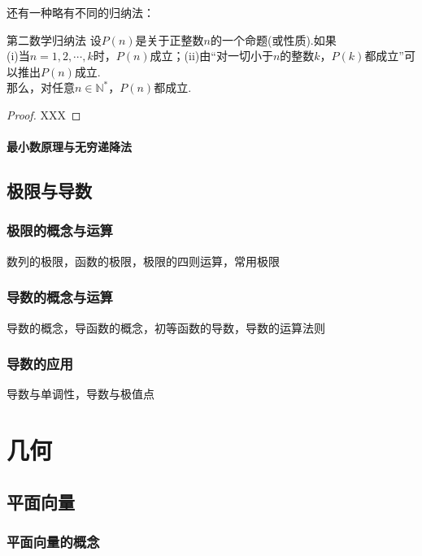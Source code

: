 \documentclass[lang=cn, zihao=4.5]{elegantbook}
\begin{document}
还有一种略有不同的归纳法：

\begin{theorem}{第二数学归纳法}
	设$P(n)$是关于正整数$n$的一个命题(或性质).如果 \\
	(i)当$n=1,2, \cdots ,k$时，$P(n)$成立；(ii)由“对一切小于$n$的整数$k$，$P(k)$都成立”可以推出$P(n)$成立. \\
	那么，对任意$n \in \mathbb{N}^{*}$，$P(n)$都成立.
\end{theorem}
\begin{proof}
	XXX
\end{proof}

\subsection{最小数原理与无穷递降法}

\chapter{极限与导数}

\section{极限的概念与运算}

数列的极限，函数的极限，极限的四则运算，常用极限

\section{导数的概念与运算}

导数的概念，导函数的概念，初等函数的导数，导数的运算法则

\section{导数的应用}

导数与单调性，导数与极值点

\part{几何}

\chapter{平面向量}

\section{平面向量的概念}
\end{document}
